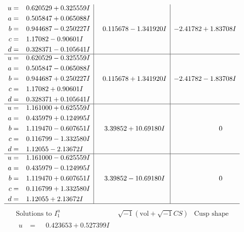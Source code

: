 \documentclass[1p]{elsarticle_modified}
\theoremstyle{definition}
\newcommand{\I}{\sqrt{-1}}
\begin{document}
$$\begin{array}{c|c|c}
\begin{aligned}
u &= \phantom{-}0.620529 + 0.325559 I \\
a &= \phantom{-}0.505847 + 0.065088 I \\
b &= \phantom{-}0.944687 - 0.250227 I \\
c &= \phantom{-}1.17082 - 0.90601 I \\
d &= \phantom{-}0.328371 - 0.105641 I\end{aligned}
 & \phantom{-}0.115678 - 1.341920 I & -2.41782 + 1.83708 I \\ \hline\begin{aligned}
u &= \phantom{-}0.620529 - 0.325559 I \\
a &= \phantom{-}0.505847 - 0.065088 I \\
b &= \phantom{-}0.944687 + 0.250227 I \\
c &= \phantom{-}1.17082 + 0.90601 I \\
d &= \phantom{-}0.328371 + 0.105641 I\end{aligned}
 & \phantom{-}0.115678 + 1.341920 I & -2.41782 - 1.83708 I \\ \hline\begin{aligned}
u &= \phantom{-}1.161000 + 0.625559 I \\
a &= \phantom{-}0.435979 + 0.124995 I \\
b &= \phantom{-}1.119470 - 0.607651 I \\
c &= \phantom{-}0.116799 - 1.332580 I \\
d &= \phantom{-}1.12055 - 2.13672 I\end{aligned}
 & \phantom{-}3.39852 + 10.69180 I & \phantom{-0.000000 } 0 \\ \hline\begin{aligned}
u &= \phantom{-}1.161000 - 0.625559 I \\
a &= \phantom{-}0.435979 - 0.124995 I \\
b &= \phantom{-}1.119470 + 0.607651 I \\
c &= \phantom{-}0.116799 + 1.332580 I \\
d &= \phantom{-}1.12055 + 2.13672 I\end{aligned}
 & \phantom{-}3.39852 - 10.69180 I & \phantom{-0.000000 } 0\\
 \hline 
 \end{array}$$\newpage$$\begin{array}{c|c|c}  
\text{Solutions to }I^u_{1}& \I (\text{vol} + \sqrt{-1}CS) & \text{Cusp shape}\\
 \hline 
\begin{aligned}
u &= \phantom{-}0.423653 + 0.527399 I \\

\end{aligned}
\end{array}$$
\end{document}
